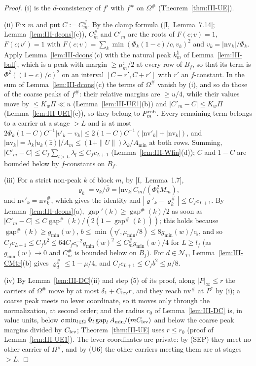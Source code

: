 \documentclass[10pt]{amsart}
\theoremstyle{definition}
\theoremstyle{remark}
\newcommand{\gap}{\operatorname{gap}}
\newcommand{\zh}{\hat z}
\begin{document}
\begin{proof}
(i) is the $d$-consistency of $f'$ with $f^\#$ on $\Omega^\#$
(Theorem~\ref{thm:III-UE}).

(ii) Fix $m$ and put $C:=C^\#_m$.  By the clamp formula ([I,~Lemma~7.14];
Lemma~\ref{lem:III-dcons}(c)), $C^\#_m$ and $C'_m$ are the roots of
$F(c;v)=1$, $F(c;v')=1$ with $F(c;v)=\sum_k\min(\Phi_k(1-c)/c,v_k)^2$ and
$v_k=|\mathrm{nv}_k|/\Phi_k$.  Apply Lemma~\ref{lem:III-dcons}(c) with the natural
peak $k^\natural_m$ of Lemma~\ref{lem:III-ball}, which is a peak with margin
$\ge\mu^\natural_m/2$ at every row of $B_f$, so that its term is
$\Phi^2((1-c)/c)^2$ on an interval $[C-r',C+r']$ with $r'$ an $f$-constant.  In
the sum of Lemma~\ref{lem:III-dcons}(c) the terms of $\Omega^\#$ vanish by (i),
and so do those of the coarse peaks of $f^\#$: their relative margins are
$\ge u/4$, while their values move by $\le K_w\Pi\ll u$
(Lemma~\ref{lem:III-UE1}(b)) and $|C'_m-C|\le K_w\Pi$
(Lemma~\ref{lem:III-UE1}(c)), so they belong to $P^{\rm rob}_m$.  Every remaining
term belongs to a carrier at a stage $>L$ and is at most
$2\Phi_k(1-C)C^{-1}|v'_k-v_k|\le2(1-C)C^{-1}(|\mathrm{nv}'_k|+|\mathrm{nv}_k|)$, and
$|\mathrm{nv}_k|=\lambda_k|u_k(\zh)|/A_m\le(1+\|U\|)\lambda_k/A_{\min}$ at both rows.
Summing, $|C'_m-C|\le C_f\sum_{l>L}\lambda_l\le C_fc_{L+1}$ (Lemma~\ref{lem:III-Wfin}(d));
$C$ and $1-C$ are bounded below by $f$-constants on $B_f$.

(iii) For a strict non-peak $k$ of block $m$, by [I,~Lemma~1.7],
\[
 \varrho_k=\mathsf v_k/\bar\vartheta=|\mathrm{nv}_k|C_m/(\Phi_k^2M_m),
\]
and $\mathrm{nv}'_k=\mathrm{nv}^\#_k$,
which gives the identity and $|\varrho'_k-\varrho^\#_k|\le C_fc_{L+1}$.  By
Lemma~\ref{lem:III-dcons}(a), $\gap'(k)\ge\gap^\#(k)/2$ as soon as $|C'_m-C|\le
C\gap^\#(k)/(2(1-\gap^\#(k)))$; this holds because $\gap^\#(k)\ge g_{\min}(w)$,
$b\le\min(\eta',\mu_{\min}/8)\le8g_{\min}(w)/c_\flat$, and so $C_fc_{L+1}\le C_fb^2
\le64C_fc_\flat^{-2}g_{\min}(w)^2\le C^\#_mg_{\min}(w)/4$ for $L\ge l_f$ (as
$g_{\min}(w)\to0$ and $C^\#_m$ is bounded below on $B_f$).  For $d\in
\mathcal N_T$, Lemma~\ref{lem:III-CMtr}(b) gives $\varrho^\#_d\le1-\mu/4$, and
$C_fc_{L+1}\le C_fb^2\le\mu/8$.

(iv) By Lemma~\ref{lem:III-DC}(ii) and step (5) of its proof, along
$|P|_\infty\le r$ the carriers of $\Omega^\#$ move by at most
$\delta_1+C_{\rm lev}r$, and they reach $\mathrm{nv}^\#$ at $P^*$ by (i); a coarse
peak meets no lever coordinate, so it moves only through the normalization,
at second order; and the radius $r_0$ of
Lemma~\ref{lem:III-DC} is, in value units, below $c\min_{l\in\Omega}\Phi_l\gap_l
A_{\min}/(mC_{\rm lev})$ and below the coarse peak margins divided by
$C_{\rm lev}$; Theorem~\ref{thm:III-UE} uses $r\le r_0$ (proof of
Lemma~\ref{lem:III-UE1}).  The lever coordinates are private: by (SEP) they meet
no other carrier of $\Omega^\#$, and by (U6) the other carriers meeting them
are at stages $>L$.
\end{proof}
\end{document}
